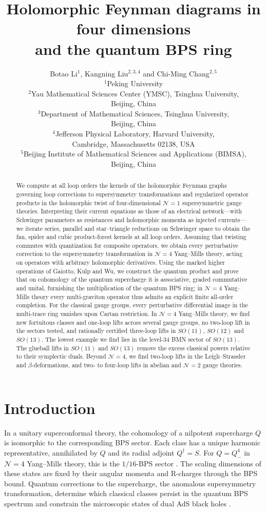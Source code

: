 \documentclass[11pt]{article}
\title{Holomorphic Feynman diagrams in four dimensions\\ and the quantum BPS ring}
\author{Botao Li$^{1}$, Kangning Liu$^{2,3,4}$ and Chi-Ming Chang$^{2,5}$\\[6pt]
{\small $^{1}$Peking University}\\[3pt]
{\small $^{2}$Yau Mathematical Sciences Center (YMSC), Tsinghua University,}\\
{\small Beijing, China}\\[3pt]
{\small $^{3}$Department of Mathematical Sciences, Tsinghua University,}\\
{\small Beijing, China}\\[3pt]
{\small $^{4}$Jefferson Physical Laboratory, Harvard University,}\\
{\small Cambridge, Massachusetts 02138, USA}\\[3pt]
{\small $^{5}$Beijing Institute of Mathematical Sciences and Applications (BIMSA),}\\
{\small Beijing, China}}
\date{}
\numberwithin{equation}{section}
\numberwithin{figure}{section}
\numberwithin{table}{section}
\begin{document}
\maketitle
\begin{abstract}
We compute at all loop orders the kernels of the holomorphic Feynman graphs governing loop corrections to supersymmetry transformations and regularized operator products in the holomorphic twist of four-dimensional $\mathcal N=1$ supersymmetric gauge theories. Interpreting their current equations as those of an electrical network---with Schwinger parameters as resistances and holomorphic momenta as injected currents---we iterate series, parallel and star--triangle reductions on Schwinger space to obtain the fan, spider and cubic product-forest kernels at all loop orders. Assuming that twisting commutes with quantization for composite operators, we obtain every perturbative correction to the supersymmetry transformation in $\mathcal N=4$ Yang--Mills theory, acting on operators with arbitrary holomorphic derivatives. Using the marked higher operations of Gaiotto, Kulp and Wu, we construct the quantum product and prove that on cohomology of the quantum supercharge it is associative, graded commutative and unital, furnishing the multiplication of the quantum BPS ring; in $\mathcal N=4$ Yang--Mills theory every multi-graviton operator thus admits an explicit finite all-order completion. For the classical gauge groups, every perturbative differential image in the multi-trace ring vanishes upon Cartan restriction. In $\mathcal N=4$ Yang--Mills theory, we find new fortuitous classes and one-loop lifts across several gauge groups, no two-loop lift in the sectors tested, and rationally certified three-loop lifts in $SO(11)$, $SO(12)$ and $SO(13)$. The lowest example we find lies in the level-$34$ BMN sector of $SO(13)$. The glueball lifts in $SO(11)$ and $SO(13)$ remove the excess classical powers relative to their symplectic duals. Beyond $\mathcal N=4$, we find two-loop lifts in the Leigh--Strassler and $\beta$-deformations, and two- to four-loop lifts in abelian and $\mathcal N=2$ gauge theories.
\end{abstract}
{\small\setcounter{tocdepth}{2}\tableofcontents}
\bigskip

\section{Introduction}\label{sec-introduction}

In a unitary superconformal theory, the cohomology of a nilpotent supercharge $Q$ is isomorphic to the corresponding BPS sector. Each class has a unique harmonic representative, annihilated by $Q$ and its radial adjoint $Q^\dagger=S$. For $Q=Q^4_-$ in $\mathcal N=4$ Yang--Mills theory, this is the $1/16$-BPS sector \cite[Section 2]{ChangYin}. The scaling dimensions of these states are fixed by their angular momenta and R-charges through the BPS bound. Quantum corrections to the supercharge, the anomalous supersymmetry transformation, determine which classical classes persist in the quantum BPS spectrum and constrain the microscopic states of dual AdS black holes \cite{KonishiBH}.
\end{document}
